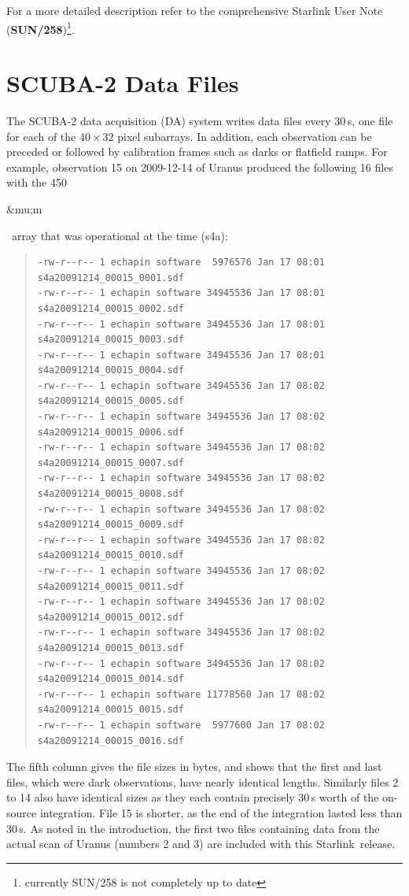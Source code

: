 \documentclass[twoside,11pt]{article}
\newcommand{\micron}{\mbox{\,${\umu}$m}}            %
\newcommand{\htmladdnormallink}[2]{#1}
\newcommand{\xref}[3]{#1}
\newcommand{\xlabel}[1]{}
\renewcommand{\_}{\texttt{\symbol{95}}}
\newenvironment{myquote}{\begin{quote}\begin{small}}{\end{small}\end{quote}}
\newcommand{\starlink}{\htmladdnormallink{Starlink}{http://starlink.jach.hawaii.edu}}
\newcommand{\smurfsun}{\xref{\textbf{SUN/258}}{sun258}{}}
\renewcommand{\micron}{\begin{rawhtml}&mu;m\end{rawhtml}}
\begin{document}
For a more detailed description refer to the comprehensive Starlink
User Note (\smurfsun)\footnote{currently SUN/258 is not completely up
  to date}.


\section{\xlabel{data_files}SCUBA-2 Data Files}
\label{sec:data}

The SCUBA-2 data acquisition (DA) system writes data files every
30\,s, one file for each of the $40\times32$ pixel subarrays. In
addition, each observation can be preceded or followed by calibration
frames such as darks or flatfield ramps. For example, observation 15
on 2009-12-14 of Uranus produced the following 16 files with the
450\micron\ array that was operational at the time (s4a):

\begin{myquote}
\begin{verbatim}
-rw-r--r-- 1 echapin software  5976576 Jan 17 08:01 s4a20091214_00015_0001.sdf
-rw-r--r-- 1 echapin software 34945536 Jan 17 08:01 s4a20091214_00015_0002.sdf
-rw-r--r-- 1 echapin software 34945536 Jan 17 08:01 s4a20091214_00015_0003.sdf
-rw-r--r-- 1 echapin software 34945536 Jan 17 08:01 s4a20091214_00015_0004.sdf
-rw-r--r-- 1 echapin software 34945536 Jan 17 08:02 s4a20091214_00015_0005.sdf
-rw-r--r-- 1 echapin software 34945536 Jan 17 08:02 s4a20091214_00015_0006.sdf
-rw-r--r-- 1 echapin software 34945536 Jan 17 08:02 s4a20091214_00015_0007.sdf
-rw-r--r-- 1 echapin software 34945536 Jan 17 08:02 s4a20091214_00015_0008.sdf
-rw-r--r-- 1 echapin software 34945536 Jan 17 08:02 s4a20091214_00015_0009.sdf
-rw-r--r-- 1 echapin software 34945536 Jan 17 08:02 s4a20091214_00015_0010.sdf
-rw-r--r-- 1 echapin software 34945536 Jan 17 08:02 s4a20091214_00015_0011.sdf
-rw-r--r-- 1 echapin software 34945536 Jan 17 08:02 s4a20091214_00015_0012.sdf
-rw-r--r-- 1 echapin software 34945536 Jan 17 08:02 s4a20091214_00015_0013.sdf
-rw-r--r-- 1 echapin software 34945536 Jan 17 08:02 s4a20091214_00015_0014.sdf
-rw-r--r-- 1 echapin software 11778560 Jan 17 08:02 s4a20091214_00015_0015.sdf
-rw-r--r-- 1 echapin software  5977600 Jan 17 08:02 s4a20091214_00015_0016.sdf
\end{verbatim}
\end{myquote}

The fifth column gives the file sizes in bytes, and shows that the
first and last files, which were dark observations, have nearly
identical lengths. Similarly files 2 to 14 also have identical sizes
as they each contain precisely 30\,s worth of the on-source
integration. File 15 is shorter, as the end of the integration lasted
less than 30\,s.  As noted in the introduction, the first two files
containing data from the actual scan of Uranus (numbers 2 and 3) are
included with this \starlink\ release.
\end{document}
